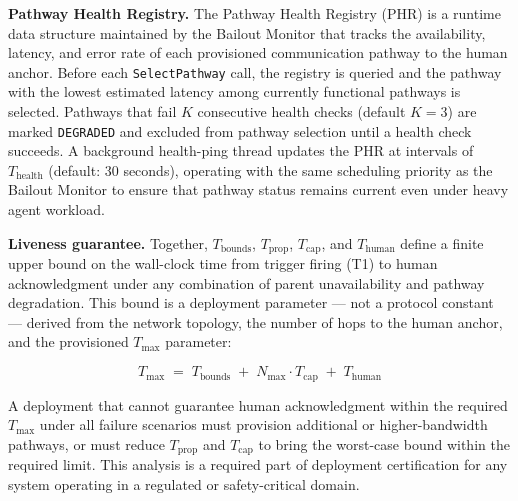 \bigskip
\noindent\textbf{Pathway Health Registry.} The Pathway Health Registry (PHR) is a runtime data structure maintained by the Bailout Monitor that tracks the availability, latency, and error rate of each provisioned communication pathway to the human anchor. Before each \texttt{SelectPathway} call, the registry is queried and the pathway with the lowest estimated latency among currently functional pathways is selected. Pathways that fail $K$ consecutive health checks (default $K = 3$) are marked \texttt{DEGRADED} and excluded from pathway selection until a health check succeeds. A background health-ping thread updates the PHR at intervals of $T_{\text{health}}$ (default: 30 seconds), operating with the same scheduling priority as the Bailout Monitor to ensure that pathway status remains current even under heavy agent workload.

\bigskip
\noindent\textbf{Liveness guarantee.} Together, $T_{\text{bounds}}$, $T_{\text{prop}}$, $T_{\text{cap}}$, and $T_{\text{human}}$ define a finite upper bound on the wall-clock time from trigger firing (T1) to human acknowledgment under any combination of parent unavailability and pathway degradation. This bound is a deployment parameter — not a protocol constant — derived from the network topology, the number of hops to the human anchor, and the provisioned $T_{\max}$ parameter:

\begin{equation}
T_{\max} \;=\; T_{\text{bounds}} \;+\; N_{\max} \cdot T_{\text{cap}} \;+\; T_{\text{human}} \tag{T-max}
\end{equation}

A deployment that cannot guarantee human acknowledgment within the required $T_{\max}$ under all failure scenarios must provision additional or higher-bandwidth pathways, or must reduce $T_{\text{prop}}$ and $T_{\text{cap}}$ to bring the worst-case bound within the required limit. This analysis is a required part of deployment certification for any \bxthree{} system operating in a regulated or safety-critical domain.
